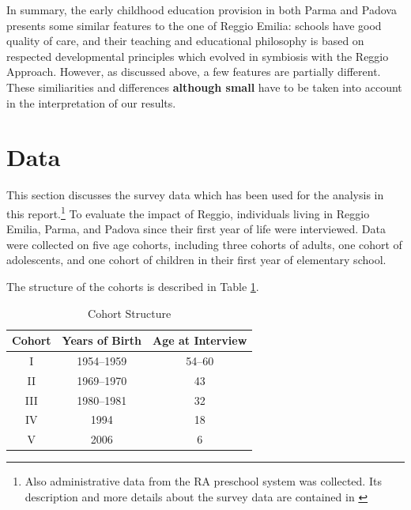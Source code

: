\documentclass[12pt]{article}
\begin{document}
In summary, the early childhood education provision in both Parma and Padova
presents some similar features to the one of Reggio Emilia: schools have
good quality of care, and their teaching and educational philosophy is based
on respected developmental principles which evolved in symbiosis with the
Reggio Approach. However, as discussed above, a few features are partially
different. These similiarities and differences \textbf{although small} have
to be taken into account in the interpretation of our results.


\section{Data}

\label{sec:data}

This section discusses the survey data which has been used for the analysis
in this report.\footnote{%
Also administrative data from the RA preschool system was collected. Its
description and more details about the survey data are contained in %
\citet{biroli2015evaluating}} To evaluate the impact of Reggio, individuals
living in Reggio Emilia, Parma, and Padova since their first year of life
were interviewed. Data were collected on five age cohorts, including three
cohorts of adults, one cohort of adolescents, and one cohort of children in
their first year of elementary school.

The structure of the cohorts is described in Table \ref{tab:cohorts}.

\begin{table}[ht]
\caption{Cohort Structure}
\label{tab:cohorts}
\begin{center}
\begin{tabular}{ccc}
\hline\hline
Cohort & Years of Birth & Age at Interview \\ \hline
I & 1954--1959 & 54--60 \\ 
II & 1969--1970 & 43 \\ 
III & 1980--1981 & 32 \\ 
IV & 1994 & 18 \\ 
V & 2006 & 6 \\ \hline
\end{tabular}%
\end{center}
\end{table}

\end{document}
